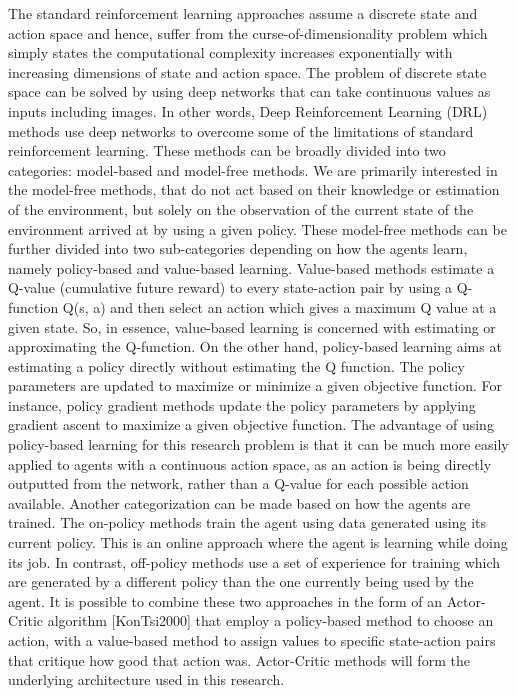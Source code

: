 \documentclass{article}
\begin{document}
The standard reinforcement learning approaches assume a discrete state and action space and hence, suffer from the curse-of-dimensionality problem which simply states the computational complexity increases exponentially with increasing dimensions of state and action space. The problem of discrete state space can be solved by using deep networks that can take continuous values as inputs including images. In other words, Deep Reinforcement Learning (DRL) methods use deep networks to overcome some of the limitations of standard reinforcement learning. These methods can be broadly divided into two categories: model-based and model-free methods. We are primarily interested in the model-free methods, that do not act based on their knowledge or estimation of the environment, but solely on the observation of the current state of the environment arrived at by using a given policy. These model-free methods can be further divided into two sub-categories depending on how the agents learn, namely policy-based and value-based learning. Value-based methods estimate a Q-value (cumulative future reward) to every state-action pair by using a Q-function Q(s, a) and then select an action which gives a maximum Q value at a given state.  So, in essence, value-based learning is concerned with estimating or approximating the Q-function. On the other hand, policy-based learning aims at estimating  a policy  directly without estimating the Q function. The policy parameters are updated to maximize or minimize a given objective function.  For instance, policy gradient methods update the policy parameters by applying gradient ascent to maximize a given objective function. The advantage of using policy-based learning for this research problem is that it can be much more easily applied to agents with a continuous action space, as an action is being directly outputted from the network, rather than a Q-value for each possible action available. Another categorization can be made based on how the agents are trained. The on-policy methods train the agent using data generated using its current policy. This is an online approach where the agent is learning while doing its  job. In contrast, off-policy methods use a set of experience for training which are generated by a different policy than the one currently being  used by the agent. It is possible to combine these two approaches in the form of an Actor-Critic algorithm  [KonTsi2000]  that employ a policy-based method to choose an action, with a value-based method to assign values to specific state-action pairs that critique how good that action was. Actor-Critic methods will form the underlying architecture used in this research.
\end{document}

